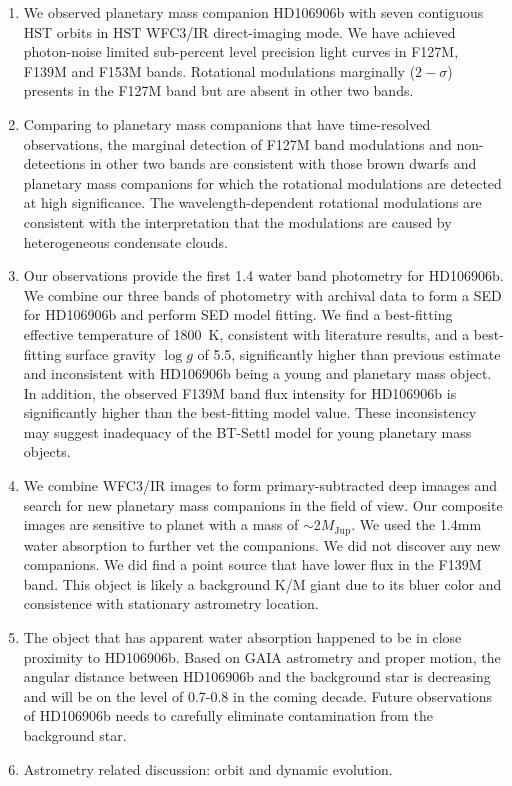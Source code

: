 \documentclass[twocolumn]{aastex62}
\newcommand{\mjup}{\ensuremath{M_\mathrm{Jup}}\xspace}
\begin{document}
\begin{enumerate}
\item We observed planetary mass companion HD106906b with seven contiguous HST orbits in HST WFC3/IR direct-imaging mode. We have achieved photon-noise limited sub-percent level precision light curves in F127M, F139M and F153M bands. Rotational modulations marginally ($2-\sigma$) presents in the F127M band but are absent in other two bands.

\item Comparing to planetary mass companions that have time-resolved observations, the marginal detection of  F127M band modulations and non-detections in other two bands are consistent with those brown dwarfs and planetary mass companions for which the rotational modulations are detected at high significance. The wavelength-dependent rotational modulations are consistent with the interpretation that the modulations are caused by heterogeneous condensate clouds.

\item Our observations provide the first 1.4 \micron water band photometry for HD106906b. We combine our three bands of photometry with archival data to form a SED for HD106906b and perform SED model fitting. We find a best-fitting effective temperature of 1800~K, consistent with literature results, and a best-fitting surface gravity $\log g$ of 5.5,  significantly higher than previous estimate and inconsistent with HD106906b being a young and planetary mass object. In addition, the observed F139M band flux intensity for HD106906b is significantly higher than the best-fitting model value. These inconsistency may suggest inadequacy of the BT-Settl model for young planetary mass objects.

\item We combine WFC3/IR images to form primary-subtracted deep imaages and search for new planetary mass companions in the field of view. Our composite images are sensitive to planet with a mass of $\sim 2 \mjup$. We used the 1.4mm water absorption to further vet the companions. We did not discover  any new companions. We did find a point source that have lower flux in the F139M band. This object is likely a background K/M giant due to its bluer color and consistence with stationary astrometry location.

\item The object that has apparent water absorption happened to be in close proximity to HD106906b. Based on GAIA astrometry and proper motion, the angular distance between HD106906b and the background star is decreasing and will be on the level of 0\arcsec.7-0\arcsec.8  in the coming decade. Future observations of HD106906b needs to carefully eliminate contamination from the background star.

\item Astrometry related discussion:  orbit and dynamic evolution.
\end{enumerate}
\end{document}
